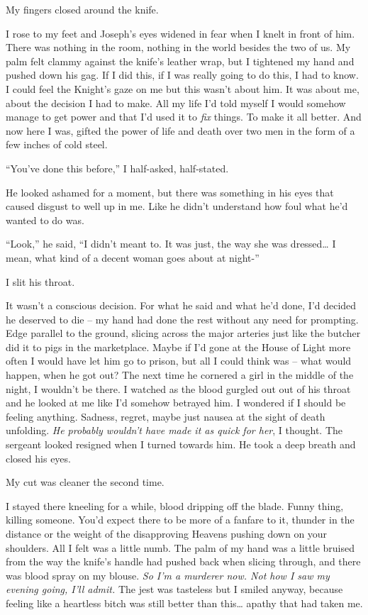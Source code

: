 \documentclass[12pt, openany]{book}
\begin{document}
My fingers closed around the knife. 

I rose to my feet and Joseph’s eyes widened in fear when I knelt in front of him. There was nothing in the room, nothing in the world besides the two of us. My palm felt clammy against the knife’s leather wrap, but I tightened my hand and pushed down his gag. If I did this, if I was really going to do this, I had to know. I could feel the Knight’s gaze on me but this wasn’t about him. It was about me, about the decision I had to make. All my life I’d told myself I would somehow manage to get power and that I’d used it to \textit{fix} things. To make it all better. And now here I was, gifted the power of life and death over two men in the form of a few inches of cold steel.

“You’ve done this before,” I half-asked, half-stated.

He looked ashamed for a moment, but there was something in his eyes that caused disgust to well up in me. Like he didn’t understand how foul what he’d wanted to do was.

“Look,” he said, “I didn’t meant to. It was just, the way she was dressed… I mean, what kind of a decent woman goes about at night-”

I slit his throat.

It wasn’t a conscious decision. For what he said and what he’d done, I’d decided he deserved to die – my hand had done the rest without any need for prompting. Edge parallel to the ground, slicing across the major arteries just like the butcher did it to pigs in the marketplace. Maybe if I’d gone at the House of Light more often I would have let him go to prison, but all I could think was – what would happen, when he got out? The next time he cornered a girl in the middle of the night, I wouldn’t be there. I watched as the blood gurgled out out of his throat and he looked at me like I’d somehow betrayed him. I wondered if I should be feeling anything. Sadness, regret, maybe just nausea at the sight of death unfolding. \textit{He probably wouldn’t have made it as quick for her}, I thought. The sergeant looked resigned when I turned towards him. He took a deep breath and closed his eyes. 

My cut was cleaner the second time.

I stayed there kneeling for a while, blood dripping off the blade. Funny thing, killing someone. You’d expect there to be more of a fanfare to it, thunder in the distance or the weight of the disapproving Heavens pushing down on your shoulders. All I felt was a little numb. The palm of my hand was a little bruised from the way the knife’s handle had pushed back when slicing through, and there was blood spray on my blouse. \textit{So I’m a murderer now. Not how I saw my evening going, I’ll admit.} The jest was tasteless but I smiled anyway, because feeling like a heartless bitch was still better than this… apathy that had taken me.
\end{document}
